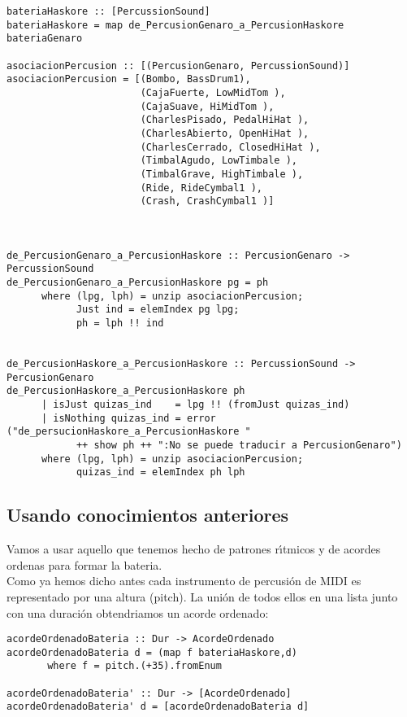 \small
\begin{verbatim}
bateriaHaskore :: [PercussionSound]
bateriaHaskore = map de_PercusionGenaro_a_PercusionHaskore bateriaGenaro

asociacionPercusion :: [(PercusionGenaro, PercussionSound)]
asociacionPercusion = [(Bombo, BassDrum1),
                       (CajaFuerte, LowMidTom ),
                       (CajaSuave, HiMidTom ),
                       (CharlesPisado, PedalHiHat ),
                       (CharlesAbierto, OpenHiHat ),
                       (CharlesCerrado, ClosedHiHat ),
                       (TimbalAgudo, LowTimbale ),
                       (TimbalGrave, HighTimbale ),
                       (Ride, RideCymbal1 ),
                       (Crash, CrashCymbal1 )]



de_PercusionGenaro_a_PercusionHaskore :: PercusionGenaro -> PercussionSound
de_PercusionGenaro_a_PercusionHaskore pg = ph
      where (lpg, lph) = unzip asociacionPercusion;
            Just ind = elemIndex pg lpg;
            ph = lph !! ind


de_PercusionHaskore_a_PercusionHaskore :: PercussionSound -> PercusionGenaro
de_PercusionHaskore_a_PercusionHaskore ph 
      | isJust quizas_ind    = lpg !! (fromJust quizas_ind)
      | isNothing quizas_ind = error ("de_persucionHaskore_a_PercusionHaskore " 
            ++ show ph ++ ":No se puede traducir a PercusionGenaro")
      where (lpg, lph) = unzip asociacionPercusion;
            quizas_ind = elemIndex ph lph
\end{verbatim}
\normalsize

\subsection{Usando conocimientos anteriores}
Vamos a usar aquello que tenemos hecho de patrones r\'\i tmicos y de acordes ordenas
para formar la bateria.\\
\indent Como ya hemos dicho antes cada instrumento de percusi\'on de MIDI es representado
por una altura (pitch). La uni\'on de todos ellos en una lista
junto con una duraci\'on obtendriamos un acorde ordenado:

\small
\begin{verbatim}
acordeOrdenadoBateria :: Dur -> AcordeOrdenado
acordeOrdenadoBateria d = (map f bateriaHaskore,d)
       where f = pitch.(+35).fromEnum

acordeOrdenadoBateria' :: Dur -> [AcordeOrdenado]
acordeOrdenadoBateria' d = [acordeOrdenadoBateria d]
\end{verbatim}
\normalsize

